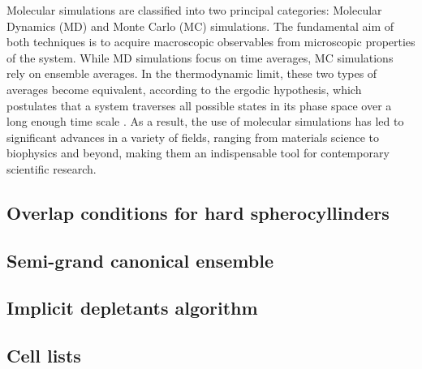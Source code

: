 Molecular simulations are classified into two principal categories: Molecular Dynamics (MD) and Monte Carlo (MC) simulations. The fundamental aim of both techniques is to acquire macroscopic observables from microscopic properties of the system. While MD simulations focus on time averages, MC simulations rely on ensemble averages. In the thermodynamic limit, these two types of averages become equivalent, according to the ergodic hypothesis, which postulates that a system traverses all possible states in its phase space over a long enough time scale \cite{dfrenkel96:mc}. As a result, the use of molecular simulations has led to significant advances in a variety of fields, ranging from materials science to biophysics and beyond, making them an indispensable tool for contemporary scientific research.

\subsection{Overlap conditions for hard spherocyllinders}

\subsection{Semi-grand canonical ensemble}

\subsection{Implicit depletants algorithm}

\subsection{Cell lists}

\clearpage